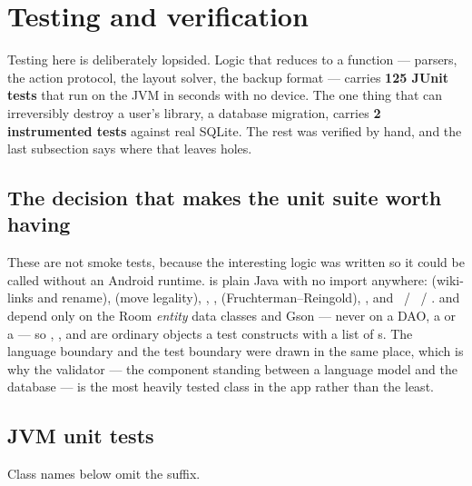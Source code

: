 \section{Testing and verification}
\label{sec:testing}

Testing here is deliberately lopsided. Logic that reduces to a function --- parsers, the action
protocol, the layout solver, the backup format --- carries \textbf{125 JUnit tests} that run on the JVM
in seconds with no device. The one thing that can irreversibly destroy a user's library, a database
migration, carries \textbf{2 instrumented tests} against real SQLite. The rest was verified by hand,
and the last subsection says where that leaves holes.

\subsection{The decision that makes the unit suite worth having}

\begin{sloppypar}
These are not smoke tests, because the interesting logic was written so it could be called without an
Android runtime.  is plain Java with no  import anywhere:
 (wiki-links and rename),  (move legality),
, ,  (Fruchterman--Reingold),
, and ~/ ~/
.  and  depend only on the Room
\emph{entity} data classes and Gson --- never on a DAO, a  or a  --- so
, ,  and  are ordinary
objects a test constructs with a list of s. The language boundary and the test boundary
were drawn in the same place, which is why the validator --- the component standing between a language
model and the database --- is the most heavily tested class in the app rather than the least.
\end{sloppypar}

\subsection{JVM unit tests}

Class names below omit the  suffix.

